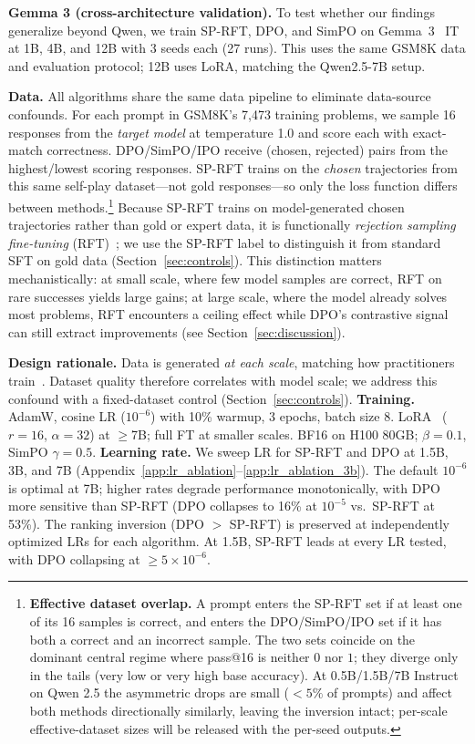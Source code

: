 \documentclass{article}
\newcommand{\sprft}{SP-RFT}
\begin{document}
\textbf{Gemma 3 (cross-architecture validation).} To test whether our findings generalize beyond Qwen, we train \sprft{}, DPO, and SimPO on Gemma~3~\citep{gemma3_2025} IT at 1B, 4B, and 12B with 3 seeds each (27 runs). This uses the same GSM8K data and evaluation protocol; 12B uses LoRA, matching the Qwen2.5-7B setup.

\textbf{Data.} All algorithms share the same data pipeline to eliminate data-source confounds. For each prompt in GSM8K's 7,473 training problems, we sample 16 responses from the \emph{target model} at temperature 1.0 and score each with exact-match correctness. DPO/SimPO/IPO receive (chosen, rejected) pairs from the highest/lowest scoring responses. \sprft{} trains on the \emph{chosen} trajectories from this same self-play dataset---not gold responses---so only the loss function differs between methods.\footnote{\textbf{Effective dataset overlap.} A prompt enters the SP-RFT set if at least one of its 16 samples is correct, and enters the DPO/SimPO/IPO set if it has both a correct and an incorrect sample. The two sets coincide on the dominant central regime where pass@16 is neither $0$ nor $1$; they diverge only in the tails (very low or very high base accuracy). At 0.5B/1.5B/7B Instruct on Qwen 2.5 the asymmetric drops are small ($<5\%$ of prompts) and affect both methods directionally similarly, leaving the inversion intact; per-scale effective-dataset sizes will be released with the per-seed outputs.} Because \sprft{} trains on model-generated chosen trajectories rather than gold or expert data, it is functionally \emph{rejection sampling fine-tuning} (RFT)~\citep{yuan2023rft}; we use the \sprft{} label to distinguish it from standard SFT on gold data (Section~\ref{sec:controls}). This distinction matters mechanistically: at small scale, where few model samples are correct, RFT on rare successes yields large gains; at large scale, where the model already solves most problems, RFT encounters a ceiling effect while DPO's contrastive signal can still extract improvements (see Section~\ref{sec:discussion}).

\textbf{Design rationale.} Data is generated \emph{at each scale}, matching how practitioners train~\citep{shao2024deepseekmath, deepseek2025r1, chen2024spin}. Dataset quality therefore correlates with model scale; we address this confound with a fixed-dataset control (Section~\ref{sec:controls}).
\textbf{Training.} AdamW, cosine LR ($10^{-6}$) with 10\% warmup, 3 epochs, batch size 8. LoRA~\citep{hu2022lora} ($r\!=\!16$, $\alpha\!=\!32$) at $\geq$7B; full FT at smaller scales. BF16 on H100 80GB; $\beta\!=\!0.1$, SimPO $\gamma\!=\!0.5$.
\textbf{Learning rate.} We sweep LR for \sprft{} and DPO at 1.5B, 3B, and 7B (Appendix~\ref{app:lr_ablation}--\ref{app:lr_ablation_3b}). The default $10^{-6}$ is optimal at 7B; higher rates degrade performance monotonically, with DPO more sensitive than \sprft{} (DPO collapses to 16\% at $10^{-5}$ vs.\ \sprft{} at 53\%). The ranking inversion (DPO $>$ \sprft{}) is preserved at independently optimized LRs for each algorithm. At 1.5B, \sprft{} leads at every LR tested, with DPO collapsing at $\geq 5 \times 10^{-6}$.
\end{document}
